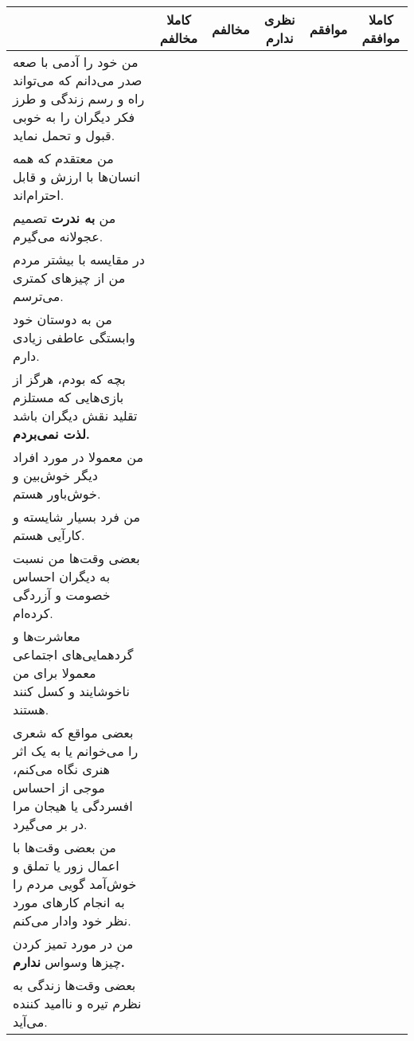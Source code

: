 \documentclass[a4paper,10pt]{article}
\begin{document}
\begin{center}
\begin{tabular}{|p{6cm}|c|c|c|c|c|}
\hline
 & کاملا مخالفم & مخالفم & نظری ندارم & موافقم & کاملا موافقم\\
\hline





من خود را آدمی با صعه صدر می‌دانم که می‌تواند راه و رسم زندگی و طرز فکر دیگران را به خوبی قبول و تحمل نماید.& & & & & \\
\hline


من معتقدم که همه انسان‌ها با ارزش و قابل احترام‌اند.& & & & & \\
\hline


من \textbf{به ندرت} تصمیم عجولانه می‌گیرم.& & & & & \\
\hline


در مقایسه با بیشتر مردم من از چیزهای کمتری می‌ترسم.& & & & & \\
\hline


من به دوستان خود وابستگی عاطفی زیادی دارم.& & & & & \\
\hline


بچه که بودم، هرگز از بازی‌هایی که مستلزم تقلید نقش دیگران باشد \textbf{لذت نمی‌بردم.}& & & & & \\
\hline


من معمولا در مورد افراد دیگر خوش‌بین و خوش‌باور هستم.& & & & & \\
\hline


من فرد بسیار شایسته و کارآیی هستم.& & & & & \\
\hline


بعضی وقت‌ها من نسبت به دیگران احساس خصومت و آزردگی کرده‌ام.& & & & & \\
\hline


معاشرت‌ها و گرد‌همایی‌های اجتماعی معمولا برای من ناخوشایند و کسل کنند هستند.& & & & & \\
\hline


بعضی مواقع که شعری را می‌خوانم یا به یک اثر هنری نگاه می‌کنم، موجی از احساس افسردگی یا هیجان مرا در بر می‌گیرد.& & & & & \\
\hline


من بعضی وقت‌ها با اعمال زور یا تملق و خوش‌آمد گویی مردم را به انجام کارهای مورد نظر خود وادار می‌کنم.& & & & & \\
\hline


من در مورد تمیز کردن چیزها وسواس \textbf{ندارم.}& & & & & \\
\hline


بعضی وقت‌ها زندگی به نظرم تیره و ناامید کننده می‌آید.& & & & & \\
\hline



\end{tabular}
\end{center}
\end{document}
